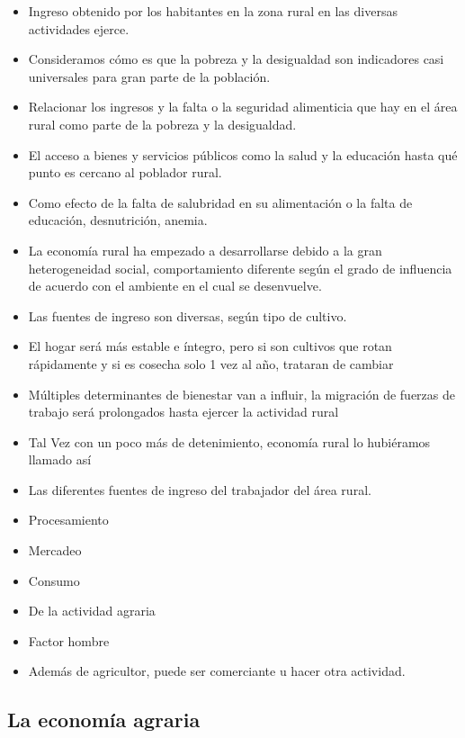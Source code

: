 \documentclass[
  a4paper,
]{article}
\begin{document}
\begin{itemize}
\item
  Ingreso obtenido por los habitantes en la zona rural en las diversas
  actividades ejerce.
\item
  Consideramos cómo es que la pobreza y la desigualdad son indicadores
  casi universales para gran parte de la población.
\item
  Relacionar los ingresos y la falta o la seguridad alimenticia que hay
  en el área rural como parte de la pobreza y la desigualdad.
\item
  El acceso a bienes y servicios públicos como la salud y la educación
  hasta qué punto es cercano al poblador rural.
\item
  Como efecto de la falta de salubridad en su alimentación o la falta de
  educación, desnutrición, anemia.
\item
  La economía rural ha empezado a desarrollarse debido a la gran
  heterogeneidad social, comportamiento diferente según el grado de
  influencia de acuerdo con el ambiente en el cual se desenvuelve.
\item
  Las fuentes de ingreso son diversas, según tipo de cultivo.
\item
  El hogar será más estable e íntegro, pero si son cultivos que rotan
  rápidamente y si es cosecha solo 1 vez al año, trataran de cambiar
\item
  Múltiples determinantes de bienestar van a influir, la migración de
  fuerzas de trabajo será prolongados hasta ejercer la actividad rural
\item
  Tal Vez con un poco más de detenimiento, economía rural lo hubiéramos
  llamado así
\item
  Las diferentes fuentes de ingreso del trabajador del área rural.
\item
  Procesamiento
\item
  Mercadeo
\item
  Consumo
\item
  De la actividad agraria
\item
  Factor hombre
\item
  Además de agricultor, puede ser comerciante u hacer otra actividad.
\end{itemize}

\hypertarget{la-economuxeda-agraria-1}{%
\subsection{La economía agraria}\label{la-economuxeda-agraria-1}}
\end{document}
